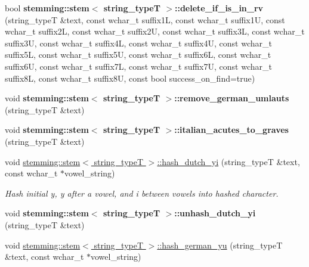 \begin{DoxyCompactItemize}
\item 
\hypertarget{group___stemming_gab0b50197480905de68f3be29714860d7}{bool {\bfseries stemming\-::stem$<$ string\-\_\-type\-T $>$\-::delete\-\_\-if\-\_\-is\-\_\-in\-\_\-rv} (string\-\_\-type\-T \&text, const wchar\-\_\-t suffix1\-L, const wchar\-\_\-t suffix1\-U, const wchar\-\_\-t suffix2\-L, const wchar\-\_\-t suffix2\-U, const wchar\-\_\-t suffix3\-L, const wchar\-\_\-t suffix3\-U, const wchar\-\_\-t suffix4\-L, const wchar\-\_\-t suffix4\-U, const wchar\-\_\-t suffix5\-L, const wchar\-\_\-t suffix5\-U, const wchar\-\_\-t suffix6\-L, const wchar\-\_\-t suffix6\-U, const wchar\-\_\-t suffix7\-L, const wchar\-\_\-t suffix7\-U, const wchar\-\_\-t suffix8\-L, const wchar\-\_\-t suffix8\-U, const bool success\-\_\-on\-\_\-find=true)}\label{group___stemming_gab0b50197480905de68f3be29714860d7}

\item 
\hypertarget{group___stemming_ga760765796790f28c1acfa3b1e603781d}{void {\bfseries stemming\-::stem$<$ string\-\_\-type\-T $>$\-::remove\-\_\-german\-\_\-umlauts} (string\-\_\-type\-T \&text)}\label{group___stemming_ga760765796790f28c1acfa3b1e603781d}

\item 
\hypertarget{group___stemming_ga85e349feabc837fa38ceb40cbfe8f16e}{void {\bfseries stemming\-::stem$<$ string\-\_\-type\-T $>$\-::italian\-\_\-acutes\-\_\-to\-\_\-graves} (string\-\_\-type\-T \&text)}\label{group___stemming_ga85e349feabc837fa38ceb40cbfe8f16e}

\item 
\hypertarget{group___stemming_gad7324f61a80140d122da1c087289b737}{void \hyperlink{group___stemming_gad7324f61a80140d122da1c087289b737}{stemming\-::stem$<$ string\-\_\-type\-T $>$\-::hash\-\_\-dutch\-\_\-yi} (string\-\_\-type\-T \&text, const wchar\-\_\-t $\ast$vowel\-\_\-string)}\label{group___stemming_gad7324f61a80140d122da1c087289b737}

\begin{DoxyCompactList}\small\item\em Hash initial y, y after a vowel, and i between vowels into hashed character. \end{DoxyCompactList}\item 
\hypertarget{group___stemming_ga00a03f9e29573b89ff269e3832aa019b}{void {\bfseries stemming\-::stem$<$ string\-\_\-type\-T $>$\-::unhash\-\_\-dutch\-\_\-yi} (string\-\_\-type\-T \&text)}\label{group___stemming_ga00a03f9e29573b89ff269e3832aa019b}

\item 
\hypertarget{group___stemming_ga2ab335f89cb2e65564a7985156d6ce19}{void \hyperlink{group___stemming_ga2ab335f89cb2e65564a7985156d6ce19}{stemming\-::stem$<$ string\-\_\-type\-T $>$\-::hash\-\_\-german\-\_\-yu} (string\-\_\-type\-T \&text, const wchar\-\_\-t $\ast$vowel\-\_\-string)}\label{group___stemming_ga2ab335f89cb2e65564a7985156d6ce19}


\end{DoxyCompactItemize}
